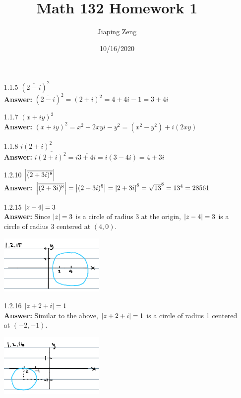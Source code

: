 \documentclass{article}
\title{Math 132 Homework 1}
\date{10/16/2020}
\author{Jiaping Zeng}
\begin{document}
\maketitle

\begin{itemize}
    \item [1.1.5] $(\overline{2-i})^2$\\
          \textbf{Answer: } $(\overline{2-i})^2=(2+i)^2=4+4i-1=3+4i$
    \item [1.1.7] $(x+iy)^2$\\
          \textbf{Answer: } $(x+iy)^2=x^2+2xyi-y^2=(x^2-y^2)+i(2xy)$
    \item [1.1.8] $i\overline{(2+i)^2}$\\
          \textbf{Answer: } $i\overline{(2+i)^2}=i\overline{3+4i}=i(3-4i)=4+3i$
    \item [1.2.10] $\abs{\overline{(2+3i)^8}}$\\
          \textbf{Answer: } $\abs{\overline{(2+3i)^8}}=\abs{(2+3i)^8}=\abs{2+3i}^8=\sqrt{13}^8=13^4=28561$
    \item [1.2.15] $\abs{z-4}=3$\\
          \textbf{Answer: } Since $\abs{z}=3$ is a circle of radius 3 at the origin, $\abs{z-4}=3$ is a circle of radius 3 centered at $(4,0)$.
          \begin{center}
              \includegraphics[width=2in]{1-2-15.png}
          \end{center}
    \item [1.2.16] $\abs{z+2+i}=1$\\
          \textbf{Answer: } Similar to the above, $\abs{z+2+i}=1$ is a circle of radius 1 centered at $(-2,-1)$.
          \begin{center}
              \includegraphics[width=2in]{1-2-16.png}
          \end{center}

\end{itemize}
\end{document}

